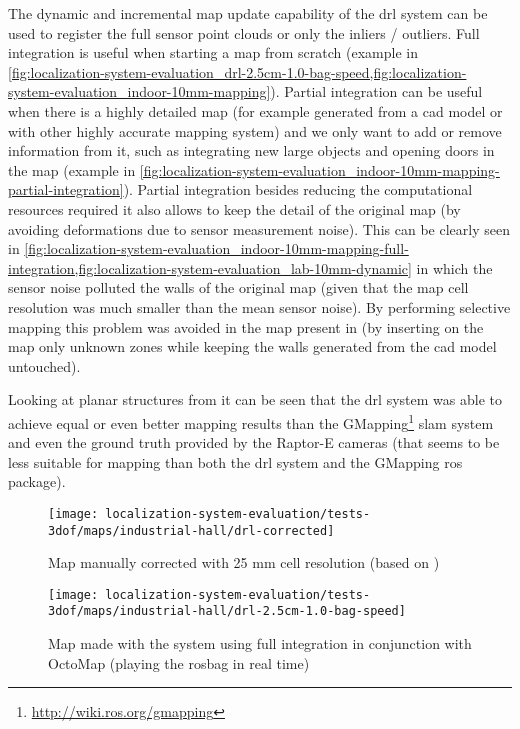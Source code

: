 The dynamic and incremental map update capability of the \gls{drl} system can be used to register the full sensor point clouds or only the inliers / outliers. Full integration is useful when starting a map from scratch (example in \cref{fig:localization-system-evaluation_drl-2.5cm-1.0-bag-speed,fig:localization-system-evaluation_indoor-10mm-mapping}). Partial integration can be useful when there is a highly detailed map (for example generated from a \gls{cad} model or with other highly accurate mapping system) and we only want to add or remove information from it, such as integrating new large objects and opening doors in the map (example in \cref{fig:localization-system-evaluation_indoor-10mm-mapping-partial-integration}). Partial integration besides reducing the computational resources required it also allows to keep the detail of the original map (by avoiding deformations due to sensor measurement noise). This can be clearly seen in \cref{fig:localization-system-evaluation_indoor-10mm-mapping-full-integration,fig:localization-system-evaluation_lab-10mm-dynamic} in which the sensor noise polluted the walls of the original map (given that the map cell resolution was much smaller than the mean sensor noise). By performing selective mapping this problem was avoided in the map present in  (by inserting on the map only unknown zones while keeping the walls generated from the \gls{cad} model untouched).

Looking at planar structures from  it can be seen that the \gls{drl} system was able to achieve equal or even better mapping results than the GMapping\footnote{\url{http://wiki.ros.org/gmapping}} \gls{slam} system and even the ground truth provided by the Raptor-E cameras (that seems to be less suitable for mapping than both the \gls{drl} system and the GMapping \gls{ros} package).

\begin{figure}[H]
	\centering
	\texttt{[image: localization-system-evaluation/tests-3dof/maps/industrial-hall/drl-corrected]}
	\caption{Map manually corrected with 25 mm cell resolution (based on ) }
	\label{fig:localization-system-evaluation_drl-corrected}
\end{figure}

\begin{figure}[H]
	\centering
	\texttt{[image: localization-system-evaluation/tests-3dof/maps/industrial-hall/drl-2.5cm-1.0-bag-speed]}
	\caption{Map made with the  system using full integration in conjunction with OctoMap (playing the rosbag in real time)}
	\label{fig:localization-system-evaluation_drl-2.5cm-1.0-bag-speed}
\end{figure}


